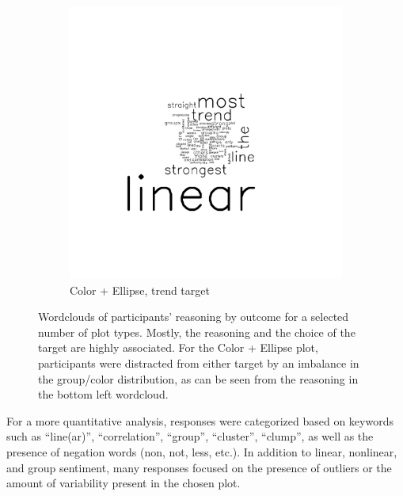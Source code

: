 \documentclass[11pt]{isuthesis}\usepackage[]{graphicx}\usepackage[]{color}
\begin{document}
\begin{figure}[ht]
\begin{subfigure}[t]{0.25\linewidth}
\end{subfigure}
\begin{subfigure}[t]{0.25\linewidth}
  \caption{Color + Ellipse, trend target}
  \includegraphics[width=\linewidth]{fig-sentiment-12}
\end{subfigure}
\caption[Wordclouds of participant responses for selected plot types]{\label{fig:wordles}Wordclouds of participants' reasoning by outcome for a selected number of plot types. Mostly, the reasoning and the choice of the target are highly associated. For the Color + Ellipse plot, participants were distracted from either target by an imbalance in the group/color distribution, as can be seen from the reasoning in the bottom left wordcloud.}
\end{figure}
For a more quantitative analysis, responses were categorized based on keywords such as ``line(ar)'', ``correlation'', ``group'', ``cluster'', ``clump'', as well as the presence of negation words (non, not, less, etc.). In addition to linear, nonlinear, and group sentiment, many responses focused on the presence of outliers or the amount of variability present in the chosen plot. 
\end{document}
